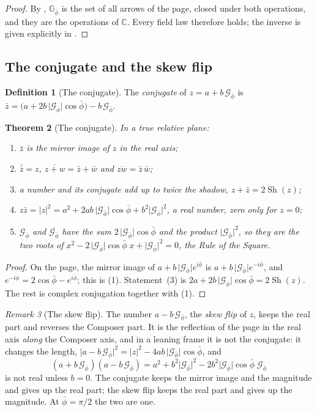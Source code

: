 \documentclass[11pt,a4paper]{amsart}
\theoremstyle{plain}
\newtheorem{theorem}{Theorem}[section]
\theoremstyle{definition}
\newtheorem{definition}[theorem]{Definition}
\theoremstyle{remark}
\newtheorem{remark}[theorem]{Remark}
\newcommand{\pb}{\bar{\phi}}                     %
\newcommand{\Gp}{\mathcal{G}_{\bar{\phi}}}       %
\newcommand{\GNp}{\mathbb{G}_{\bar{\phi}}}       %
\newcommand{\C}{\mathbb{C}}
\DeclareMathOperator{\Sh}{Sh}                    %
\begin{document}
\begin{proof}
By , $\GNp$ is the set of all arrows of the page, closed under both operations, and they are the operations of $\C$. Every field law therefore holds; the inverse is given explicitly in .
\end{proof}

\subsection{The conjugate and the skew flip}\label{subsec:conjugate}

\begin{definition}[The conjugate]\label{def:conjugate}
The \emph{conjugate} of $z = a + b\,\Gp$ is $\bar{z} = \bigl(a + 2b\,\lvert\Gp\rvert\cos\pb\bigr) - b\,\Gp$.
\end{definition}

\begin{theorem}[The conjugate]\label{thm:conjugate}
In a true relative plane:
\begin{enumerate}
  \item $\bar{z}$ is the mirror image of $z$ in the real axis;
  \item $\bar{\bar{z}} = z$, $\overline{z + w} = \bar{z} + \bar{w}$ and $\overline{zw} = \bar{z}\,\bar{w}$;
  \item a number and its conjugate add up to twice the shadow, $z + \bar{z} = 2\Sh(z)$;
  \item $z\bar{z} = \lvert z\rvert^2 = a^2 + 2ab\,\lvert\Gp\rvert\cos\pb + b^2\lvert\Gp\rvert^2$, a real number, zero only for $z = 0$;
  \item $\Gp$ and $\overline{\Gp}$ have the sum $2\,\lvert\Gp\rvert\cos\pb$ and the product $\lvert\Gp\rvert^2$, so they are the two roots of $x^2 - 2\,\lvert\Gp\rvert\cos\pb\;x + \lvert\Gp\rvert^2 = 0$, the Rule of the Square.
\end{enumerate}
\end{theorem}

\begin{proof}
On the page, the mirror image of $a + b\,\lvert\Gp\rvert e^{i\pb}$ is $a + b\,\lvert\Gp\rvert e^{-i\pb}$, and $e^{-i\pb} = 2\cos\pb - e^{i\pb}$; this is (1). Statement~(3) is $2a + 2b\,\lvert\Gp\rvert\cos\pb = 2\Sh(z)$. The rest is complex conjugation together with (1).
\end{proof}

\begin{remark}[The skew flip]\label{rem:skew-flip}
The number $a - b\,\Gp$, the \emph{skew flip} of $z$, keeps the real part and reverses the Composer part. It is the reflection of the page in the real axis \emph{along} the Composer axis, and in a leaning frame it is not the conjugate: it changes the length, $\lvert a - b\,\Gp\rvert^2 = \lvert z\rvert^2 - 4ab\,\lvert\Gp\rvert\cos\pb$, and
\[
(a + b\,\Gp)(a - b\,\Gp) = a^2 + b^2\lvert\Gp\rvert^2 - 2b^2\lvert\Gp\rvert\cos\pb\;\Gp
\]
is not real unless $b = 0$. The conjugate keeps the mirror image and the magnitude and gives up the real part; the skew flip keeps the real part and gives up the magnitude. At $\pb = \pi/2$ the two are one.
\end{remark}
\end{document}
